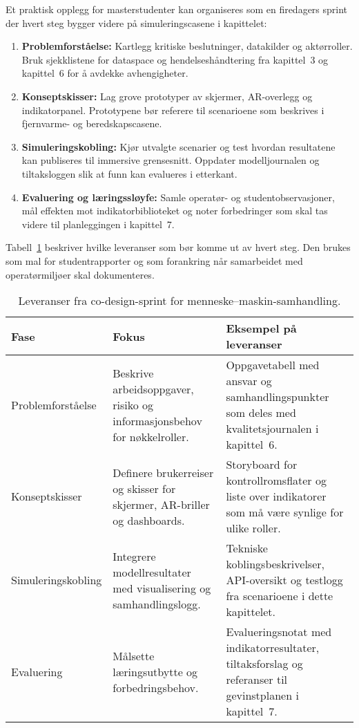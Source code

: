 Et praktisk opplegg for masterstudenter kan organiseres som en firedagers sprint der hvert steg bygger videre på simuleringscasene i kapittelet:
\begin{enumerate}
    \item \textbf{Problemforståelse:} Kartlegg kritiske beslutninger, datakilder og aktørroller. Bruk sjekklistene for dataspace og hendelseshåndtering fra kapittel~3 og kapittel~6 for å avdekke avhengigheter.
    \item \textbf{Konseptskisser:} Lag grove prototyper av skjermer, AR-overlegg og indikatorpanel. Prototypene bør referere til scenarioene som beskrives i fjernvarme- og beredskapscasene.
    \item \textbf{Simuleringskobling:} Kjør utvalgte scenarier og test hvordan resultatene kan publiseres til immersive grensesnitt. Oppdater modelljournalen og tiltaksloggen slik at funn kan evalueres i etterkant.
    \item \textbf{Evaluering og læringssløyfe:} Samle operatør- og studentobservasjoner, mål effekten mot indikatorbiblioteket og noter forbedringer som skal tas videre til planleggingen i kapittel~7.
\end{enumerate}

Tabell~\ref{tab:kap04-codesign} beskriver hvilke leveranser som bør komme ut av hvert steg. Den brukes som mal for studentrapporter og som forankring når samarbeidet med operatørmiljøer skal dokumenteres.

\begin{table}[htbp]
    \centering
    \begin{tabular}{p{}p{}p{}}
        \toprule
        \textbf{Fase} & \textbf{Fokus} & \textbf{Eksempel på leveranser}\\
        \midrule
        Problemforståelse & Beskrive arbeidsoppgaver, risiko og informasjonsbehov for nøkkelroller. & Oppgavetabell med ansvar og samhandlingspunkter som deles med kvalitetsjournalen i kapittel~6.\\
        Konseptskisser & Definere brukerreiser og skisser for skjermer, AR-briller og dashboards. & Storyboard for kontrollromsflater og liste over indikatorer som må være synlige for ulike roller.\\
        Simuleringskobling & Integrere modellresultater med visualisering og samhandlingslogg. & Tekniske koblingsbeskrivelser, API-oversikt og testlogg fra scenarioene i dette kapittelet.\\
        Evaluering & Målsette læringsutbytte og forbedringsbehov. & Evalueringsnotat med indikatorresultater, tiltaksforslag og referanser til gevinstplanen i kapittel~7.\\
        \bottomrule
    \end{tabular}
    \caption{Leveranser fra co-design-sprint for menneske--maskin-samhandling.}
    \label{tab:kap04-codesign}
\end{table}

